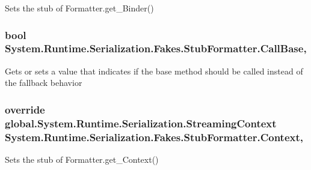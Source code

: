 Sets the stub of Formatter.\-get\-\_\-\-Binder()

\hypertarget{class_system_1_1_runtime_1_1_serialization_1_1_fakes_1_1_stub_formatter_aaf2a534db0395ca37a17c529de3977c5}{
\subsubsection[{Call\-Base}]{\setlength{\rightskip}{0pt plus 5cm}bool System.\-Runtime.\-Serialization.\-Fakes.\-Stub\-Formatter.\-Call\-Base\hspace{0.3cm}{\ttfamily [get]}, {\ttfamily [set]}}}\label{class_system_1_1_runtime_1_1_serialization_1_1_fakes_1_1_stub_formatter_aaf2a534db0395ca37a17c529de3977c5}


Gets or sets a value that indicates if the base method should be called instead of the fallback behavior

\hypertarget{class_system_1_1_runtime_1_1_serialization_1_1_fakes_1_1_stub_formatter_a9f8367d6940c51e638362a16385e04fd}{
\subsubsection[{Context}]{\setlength{\rightskip}{0pt plus 5cm}override global.\-System.\-Runtime.\-Serialization.\-Streaming\-Context System.\-Runtime.\-Serialization.\-Fakes.\-Stub\-Formatter.\-Context\hspace{0.3cm}{\ttfamily [get]}, {\ttfamily [set]}}}\label{class_system_1_1_runtime_1_1_serialization_1_1_fakes_1_1_stub_formatter_a9f8367d6940c51e638362a16385e04fd}


Sets the stub of Formatter.\-get\-\_\-\-Context()


